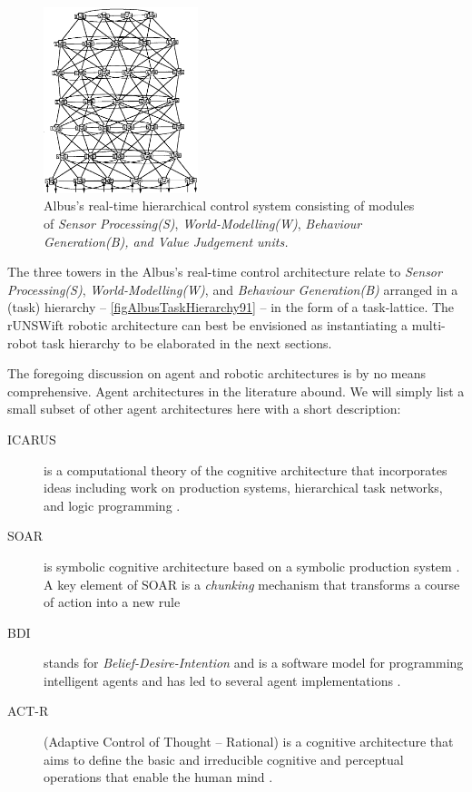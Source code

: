 \documentclass[pdftex,11pt,a4paper]{report}
\begin{document}
\begin{figure}[ht]
\centering
\includegraphics[width=0.4\textwidth]{figures/AlbusTaskHierarchy91}
\caption{Albus's real-time hierarchical control system consisting of modules of \emph{Sensor Processing(S)}, \emph{World-Modelling(W)}, \emph{Behaviour Generation(B), and \emph{Value Judgement} units.}} \label{figAlbusTaskHierarchy91}
\end{figure}

The three towers in the Albus's real-time control architecture relate to \emph{Sensor Processing(S)}, \emph{World-Modelling(W)}, and \emph{Behaviour Generation(B)} arranged in a (task) hierarchy -- \autoref{figAlbusTaskHierarchy91} -- in the form of a task-lattice. The rUNSWift robotic architecture can best be envisioned as instantiating a multi-robot task hierarchy to be elaborated in the next sections. 

The foregoing discussion on agent and robotic architectures is by no means comprehensive. Agent architectures in the literature abound. We will simply list a small subset of other agent architectures here with a short description:
\begin{description}
\item[ICARUS] is a computational theory of the cognitive architecture that incorporates ideas including work on production systems, hierarchical task networks, and logic programming \cite{langley91icarus} .
\item[SOAR] is symbolic cognitive architecture based on a symbolic production system \cite{Lehman96agentle}. A key element of SOAR is a \emph{chunking} mechanism that transforms a course of action into a new rule  
\item[BDI] stands for \emph{Belief-Desire-Intention} and is a software model for programming intelligent agents and has led to several agent implementations \cite{Rao95bdi}. 
\item[ACT-R] (Adaptive Control of Thought -- Rational) is a cognitive architecture that aims to define the basic and irreducible cognitive and perceptual operations that enable the human mind \cite{Anderson05humansymbol}.
\end{description}
\end{document}
